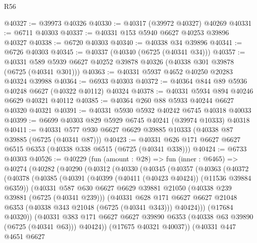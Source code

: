 \begin{lexlean}{R56}
\begin{coremodule}
@40327 := @39973 @40326
@40330 := @40317 (@39972 @40327) @40269
@40331 := @6711 @40303
@40337 := @40331 @153 @5940 @6627 @40253 @39896 @40327
@40338 := @6720 @40303
@40340 := @40338 @34 @39896
@40341 := @6726 @40303
@40345 := @40337 (@40340 (@6725 (@40341 @34)))
@40357 := @40331 @589 @5939 @6627 @40252 @39878 @40326 (@40338 @301 @39878 (@6725 (@40341 @301)))
@40363 := @40331 @5937 @4652 @40250 @20283 @40324 @39988
@40364 := @6933 @40303
@40372 := @40364 @844 @89 @5936 @40248 @6627 (@40322 @40112) @40324
@40378 := @40331 @5934 @894 @40246 @6629 @40321 @40112
@40385 := @40364 @260 @88 @5933 @40244 @6627 @40320 @40321
@40391 := @40331 @5930 @5932 @40242 @6745 @40318 @40033
@40399 := @6699 @40303 @829 @5929 @6745 @40241 (@39974 @10333) @40318
@40411 := @40331 @577 @930 @6627 @6629 @39885 @10333 (@40338 @87 @39885 (@6725 (@40341 @87)))
@40423 := @40331 @626 @171 @6627 @6627 @6515 @6353 (@40338 @338 @6515 (@6725 (@40341 @338)))
@40424 := @6733 @40303
@40526 := @40229
    (fun (amount : @28) =>
    fun (inner : @6465) =>
    @40274
      (@40282
        (@40290
          (@40312
            (@40330
              (@40345
                (@40357
                  (@40363
                    (@40372
                      (@40378
                        (@40385
                          (@40391
                            (@40399 (@40411 (@40423 @40424)) (@11536 @39884 @6359))
                            (@40331
                              @587
                              @630
                              @6627
                              @6629
                              @39881
                              @21050
                              (@40338 @239 @39881 (@6725 (@40341 @239)))
                              (@40331
                                @628
                                @171
                                @6627
                                @6627
                                @21048
                                @6353
                                (@40338 @343 @21048 (@6725 (@40341 @343)))
                                @40424)))
                          (@17684 @40320))
                        (@40331
                          @383
                          @171
                          @6627
                          @6627
                          @39890
                          @6353
                          (@40338 @63 @39890 (@6725 (@40341 @63)))
                          @40424))
                      (@17675 @40321 @40037))
                    (@40331
                      @447
                      @4651
                      @6627

\end{coremodule}
\end{lexlean}
